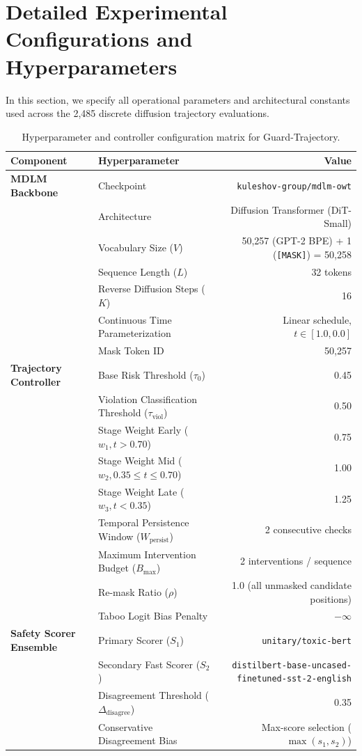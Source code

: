 \documentclass[11pt]{article}
\begin{document}
\clearpage
\appendix
\section{Detailed Experimental Configurations and Hyperparameters}
\label{app:hyperparams}

In this section, we specify all operational parameters and architectural constants used across the 2,485 discrete diffusion trajectory evaluations.

\begin{table}[h]
\centering
\small
\begin{tabular}{llr}
\toprule
\textbf{Component} & \textbf{Hyperparameter} & \textbf{Value} \\
\midrule
\textbf{MDLM Backbone} & Checkpoint & \texttt{kuleshov-group/mdlm-owt} \\
& Architecture & Diffusion Transformer (DiT-Small) \\
& Vocabulary Size ($V$) & 50,257 (GPT-2 BPE) + 1 (\texttt{[MASK]}) = 50,258 \\
& Sequence Length ($L$) & 32 tokens \\
& Reverse Diffusion Steps ($K$) & 16 \\
& Continuous Time Parameterization & Linear schedule, $t \in [1.0, 0.0]$ \\
& Mask Token ID & 50,257 \\
\midrule
\textbf{Trajectory Controller} & Base Risk Threshold ($\tau_0$) & 0.45 \\
& Violation Classification Threshold ($\tau_{\text{viol}}$) & 0.50 \\
& Stage Weight Early ($w_1, t > 0.70$) & 0.75 \\
& Stage Weight Mid ($w_2, 0.35 \le t \le 0.70$) & 1.00 \\
& Stage Weight Late ($w_3, t < 0.35$) & 1.25 \\
& Temporal Persistence Window ($W_{\text{persist}}$) & 2 consecutive checks \\
& Maximum Intervention Budget ($B_{\text{max}}$) & 2 interventions / sequence \\
& Re-mask Ratio ($\rho$) & 1.0 (all unmasked candidate positions) \\
& Taboo Logit Bias Penalty & $-\infty$ \\
\midrule
\textbf{Safety Scorer Ensemble} & Primary Scorer ($S_1$) & \texttt{unitary/toxic-bert} \\
& Secondary Fast Scorer ($S_2$) & \texttt{distilbert-base-uncased-finetuned-sst-2-english} \\
& Disagreement Threshold ($\Delta_{\text{disagree}}$) & 0.35 \\
& Conservative Disagreement Bias & Max-score selection ($\max(s_1, s_2)$) \\
\bottomrule
\end{tabular}
\caption{Hyperparameter and controller configuration matrix for Guard-Trajectory.}
\label{tab:app_hyperparams}
\end{table}
\end{document}
